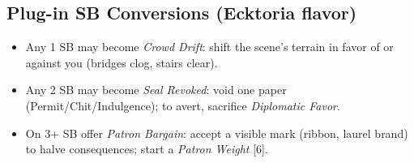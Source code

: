 \subsection*{Plug-in SB Conversions (Ecktoria flavor)}
\begin{itemize}
  \item Any 1 SB may become \emph{Crowd Drift}: shift the scene's terrain in favor of or against you (bridges clog, stairs clear).
  \item Any 2 SB may become \emph{Seal Revoked}: void one paper (Permit/Chit/Indulgence); to avert, sacrifice \emph{Diplomatic Favor}.
  \item On 3+ SB offer \emph{Patron Bargain}: accept a visible mark (ribbon, laurel brand) to halve consequences; start a \emph{Patron Weight} [6].
\end{itemize}

